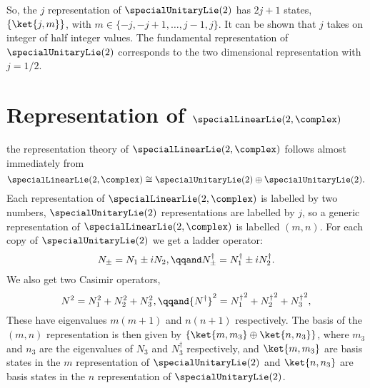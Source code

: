 \documentclass[fleqn]{NotesClass}
\newcommand{\isomorphic}{\cong}
\newcommand{\hermit}{\dagger}
\begin{document}
    So, the \(j\) representation of \(\specialUnitaryLie(2)\) has \(2j + 1\) states, \(\{\ket{j, m}\}\), with \(m \in \{-j, -j + 1, \dotsc, j - 1, j\}\).
    It can be shown that \(j\) takes on integer of half integer values.
    The fundamental representation of \(\specialUnitaryLie(2)\) corresponds to the two dimensional representation with \(j = 1/2\).
    
    \section{Representation of \texorpdfstring{\(\specialLinearLie(2, \complex)\)}{sl(2, C)}}
    the representation theory of \(\specialLinearLie(2, \complex)\) follows almost immediately from
    \begin{equation}
        \specialLinearLie(2, \complex) \isomorphic \specialUnitaryLie(2) \oplus \specialUnitaryLie(2).
    \end{equation}
    Each representation of \(\specialLinearLie(2, \complex)\) is labelled by two numbers, \(\specialUnitaryLie(2)\) representations are labelled by \(j\), so a generic representation of \(\specialLinearLie(2, \complex)\) is labelled \((m, n)\).
    For each copy of \(\specialUnitaryLie(2)\) we get a ladder operator:
    \begin{equation}
        N_{\pm} = N_1 \pm iN_2, \qqand N_{\pm}^\hermit = N_1^\hermit \pm iN_2^\hermit.
    \end{equation}
    We also get two Casimir operators,
    \begin{equation}
        N^2 = N_1^2 + N_2^2 + N_3^2, \qqand {N^\hermit}^2 = {N_1^\hermit}^2 + {N_2^\hermit}^2 + {N_3^\hermit}^2,
    \end{equation}
    These have eigenvalues \(m(m + 1)\) and \(n(n + 1)\) respectively.
    The basis of the \((m, n)\) representation is then given by \(\{\ket{m, m_3} \oplus \ket{n, n_3}\}\), where \(m_3\) and \(n_3\) are the eigenvalues of \(N_3\) and \(N_3^\hermit\) respectively, and \(\ket{m, m_3}\) are basis states in the \(m\) representation of \(\specialUnitaryLie(2)\) and \(\ket{n, n_3}\) are basis states in the \(n\) representation of \(\specialUnitaryLie(2)\).
    
\end{document}
